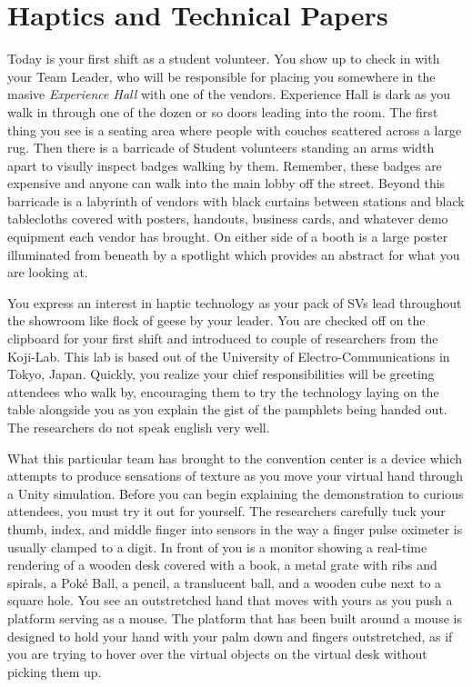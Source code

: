 \documentclass[../main.tex]{subfiles}
\begin{document}
\section{Haptics and Technical Papers}

Today is your first shift as a student volunteer. You show up to check in with your Team Leader, who will be responsible for placing you somewhere in the masive \textit{Experience Hall} with one of the vendors. Experience Hall is dark as you walk in through one of the dozen or so doors leading into the room. The first thing you see is a seating area where people with couches scattered across a large rug. Then there is a barricade of Student volunteers standing an arms width apart to visully inspect badges walking by them. Remember, these badges are expensive and anyone can walk into the main lobby off the street. Beyond this barricade is a labyrinth of vendors with black curtains between stations and black tablecloths covered with posters, handouts, business cards, and whatever demo equipment each vendor has brought. On either side of a booth is a large poster illuminated from beneath by a spotlight which provides an abstract for what you are looking at.

You express an interest in haptic technology as your pack of SVs lead throughout the showroom like flock of geese by your leader. You are checked off on the clipboard for your first shift and introduced to couple of researchers from the Koji-Lab. This lab is based out of the University of Electro-Communications in Tokyo, Japan. Quickly, you realize your chief responsibilities will be greeting attendees who walk by, encouraging them to try the technology laying on the table alongside you as you explain the gist of the pamphlets being handed out. The researchers do not speak english very well.

What this particular team has brought to the convention center is a device which attempts to produce sensations of texture as you move your virtual hand through a Unity simulation. Before you can begin explaining the demonstration to curious attendees, you must try it out for yourself. The researchers carefully tuck your thumb, index, and middle finger into sensors in the way a finger pulse oximeter is usually clamped to a digit. In front of you is a monitor showing a real-time rendering of a wooden desk covered with a book, a metal grate with ribs and spirals, a Poké Ball, a pencil, a translucent ball, and a wooden cube next to a square hole. You see an outstretched hand that moves with yours as you push a platform serving as a mouse. The platform that has been built around a mouse is designed to hold your hand with your palm down and fingers outstretched, as if you are trying to hover over the virtual objects on the virtual desk without picking them up.
\end{document}
